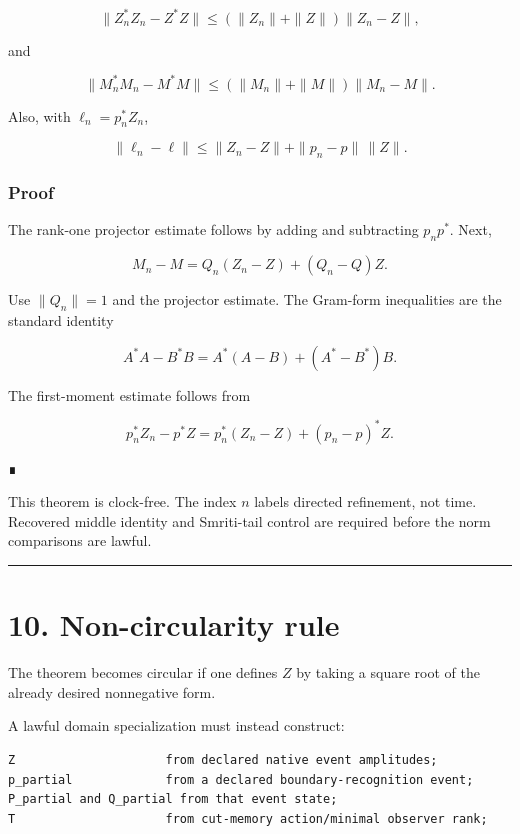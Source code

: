 \[
\boxed{
\|Z_n^*Z_n-Z^*Z\|
\le
(\|Z_n\|+\|Z\|)\|Z_n-Z\|,
}
\]

and

\[
\boxed{
\|M_n^*M_n-M^*M\|
\le
(\|M_n\|+\|M\|)\|M_n-M\|.
}
\]

Also, with \(\ell_n=p_n^*Z_n\),

\[
\boxed{
\|\ell_n-\ell\|
\le
\|Z_n-Z\|
+\|p_n-p\|\,\|Z\|.
}
\]

\hypertarget{proof-3}{%
\subsubsection{Proof}\label{proof-3}}

The rank-one projector estimate follows by adding and subtracting
\(p_np^*\). Next,

\[
M_n-M
=Q_n(Z_n-Z)+(Q_n-Q)Z.
\]

Use \(\|Q_n\|=1\) and the projector estimate. The Gram-form inequalities are
the standard identity

\[
A^*A-B^*B=A^*(A-B)+(A^*-B^*)B.
\]

The first-moment estimate follows from

\[
p_n^*Z_n-p^*Z
=p_n^*(Z_n-Z)+(p_n-p)^*Z.
\]

∎

This theorem is clock-free. The index \(n\) labels directed refinement, not
time. Recovered middle identity and Smriti-tail control are required before the
norm comparisons are lawful.

\begin{center}\rule{0.5\linewidth}{0.5pt}\end{center}

\hypertarget{non-circularity-rule}{%
\section{10. Non-circularity rule}\label{non-circularity-rule}}

The theorem becomes circular if one defines \(Z\) by taking a square root of the
already desired nonnegative form.

A lawful domain specialization must instead construct:

\begin{verbatim}
Z                     from declared native event amplitudes;
p_partial             from a declared boundary-recognition event;
P_partial and Q_partial from that event state;
T                     from cut-memory action/minimal observer rank;
\end{verbatim}

